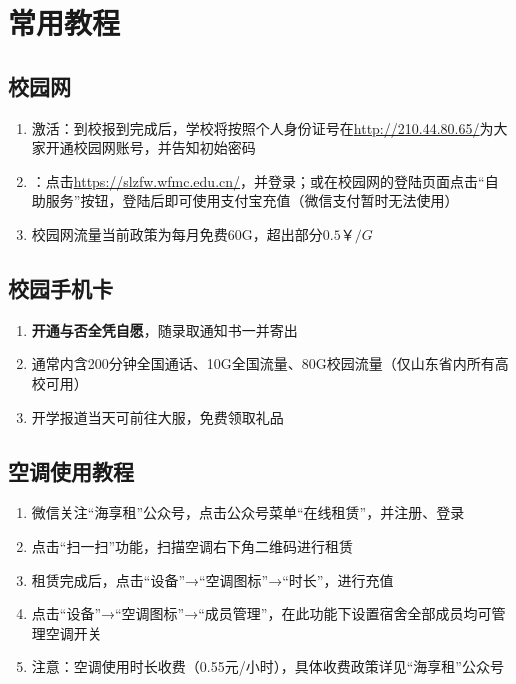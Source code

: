 \chapter[常用教程]{常用教程}

\section[校园网]{校园网}
\begin{enumerate}
    \item 激活：到校报到完成后，学校将按照个人身份证号在\uline{\href{http://210.44.80.65/}{http://210.44.80.65/}}为大家开通校园网账号，并告知初始密码\footnotemark
    \item \textbf{}：点击\uline{\href{https://slzfw.wfmc.edu.cn/}{https://slzfw.wfmc.edu.cn/}}，并登录；或在校园网的登陆页面点击“自助服务”按钮\footnotemark，登陆后即可使用支付宝充值（微信支付暂时无法使用）
    \item 校园网流量当前政策为每月免费60G，超出部分$0.5￥/G$
\end{enumerate}

\section[校园手机卡]{校园手机卡}
\begin{enumerate}
    \item \textbf{开通与否全凭自愿}，随录取通知书一并寄出
    \item 通常内含200分钟全国通话、10G全国流量、80G校园流量（仅山东省内所有高校可用）
    \item 开学报道当天可前往大服，免费领取礼品
\end{enumerate}

\section[空调使用教程]{空调使用教程}
\begin{enumerate}
    \item 微信关注“海享租”公众号，点击公众号菜单“在线租赁”，并注册、登录
    \item 点击“扫一扫”功能，扫描空调右下角二维码进行租赁
    \item 租赁完成后，点击“设备”→“空调图标”→“时长”，进行充值
    \item 点击“设备”→“空调图标”→“成员管理”，在此功能下设置宿舍全部成员均可管理空调开关
    \item 注意：空调使用时长收费（0.55元/小时），具体收费政策详见“海享租”公众号
\end{enumerate}

